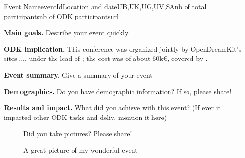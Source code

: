 \begin{event}{Event Name}{eventId}{Location and date}{UB,UK,UG,UV,SA}{nb of total participants}{nb of ODK participants}{url}

\textbf{Main goals.} Describe your event quickly

\textbf{ODK implication.} This conference was organized jointly by
OpenDreamKit's sites .... under the lead of ; the cost was of
about 60k€, covered by .

\textbf{Event summary.} Give a summary of your event

\textbf{Demographics.} Do you have demographic information? If so, please share!

\textbf{Results and impact.} What did you achieve with this event? (If ever it impacted 
other ODK tasks and deliv, mention it here)

\begin{figure}[ht]
\caption*{A great picture of my wonderful event}
Did you take pictures? Please share!
\end{figure}



\end{event}
